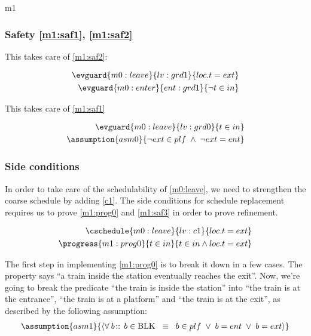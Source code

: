 \documentclass[12pt]{amsart}
\begin{document}
\begin{machine}{m1}
\subsubsection{Safety \ref{m1:saf1}, \ref{m1:saf2}}

This takes care of \eqref{m1:saf2}:

\begin{align*}
\evguard{m0:leave}{lv:grd1}
	{ loc.t = ext }
\\ \evguard{m0:enter}{ent:grd1}
	{ \neg t \in in }
\end{align*}

This takes care of \eqref{m1:saf1}

\begin{align*}
\evguard{m0:leave}{lv:grd0}
	{ t \in in }
\\ \assumption{asm0}
	{ \neg ext \in plf \1\land \neg ext = ent }
\end{align*}

\subsubsection{Side conditions}

In order to take care of the schedulability of \ref{m0:leave}, we need to strengthen the coarse schedule by adding \ref{c1}. The side conditions for schedule replacement requires us to prove \ref{m1:prog0} and \ref{m1:saf3} in order to prove refinement.

\begin{align*}
\cschedule{m0:leave}{lv:c1}
	{ loc.t = ext }
\\ \progress{m1:prog0}
	{ t \in in }{ t \in in \land loc.t = ext }
\end{align*}

The first step in implementing \eqref{m1:prog0} is to break it down in a few cases. The property says ``a train inside the station eventually reaches the exit''. Now, we're going to break the predicate ``the train is inside the station'' into ``the train is at the entrance'', ``the train is at a platform'' and ``the train is at the exit'', as described by the following assumption:
\begin{align*}
\assumption{asm1}
{	\qforall{b}{}{ b \in \Blk \2\equiv b \in plf \1\lor b = ent \1\lor b = ext }	}
\end{align*}


\end{machine}
\end{document}
